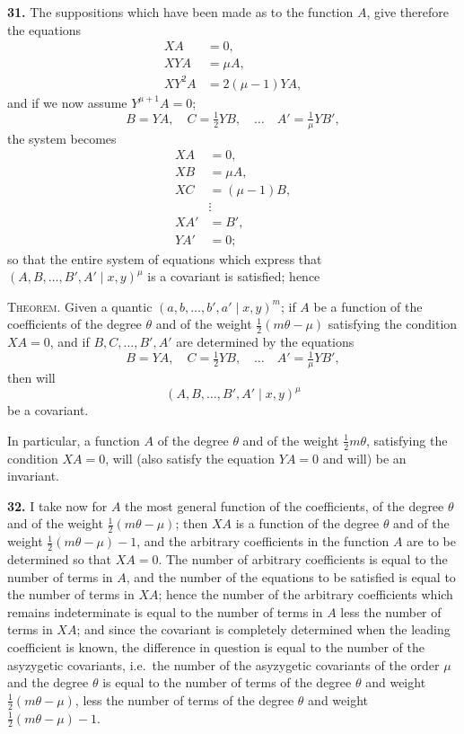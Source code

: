 \documentclass[11pt]{article}
\begin{document}
\textbf{31.} The suppositions which have been made as to the function $A$, give therefore the equations
\begin{align*}
XA &= 0, \\
XYA &= \mu A, \\
XY^2 A &= 2(\mu - 1)YA,
\end{align*}
and if we now assume $Y^{\mu+1}A = 0$;
\[
B = YA,\quad C = \tfrac{1}{2}YB,\quad \ldots\quad A' = \tfrac{1}{\mu}YB',
\]
the system becomes
\begin{align*}
XA &= 0, \\
XB &= \mu A, \\
XC &= (\mu - 1)B, \\
&\vdots \\
XA' &= B', \\
YA' &= 0;
\end{align*}
so that the entire system of equations which express that $(A, B, \ldots, B', A' \mid x, y)^\mu$ is a covariant is satisfied; hence

\medskip\noindent\textsc{Theorem.} Given a quantic $(a, b, \ldots, b', a' \mid x, y)^m$; if $A$ be a function of the coefficients of the degree $\theta$ and of the weight $\tfrac{1}{2}(m\theta - \mu)$ satisfying the condition $XA = 0$, and if $B, C, \ldots, B', A'$ are determined by the equations
\[
B = YA,\quad C = \tfrac{1}{2}YB,\quad \ldots\quad A' = \tfrac{1}{\mu}YB',
\]
then will
\[
(A, B, \ldots, B', A' \mid x, y)^\mu
\]
be a covariant.

In particular, a function $A$ of the degree $\theta$ and of the weight $\tfrac{1}{2}m\theta$, satisfying the condition $XA = 0$, will (also satisfy the equation $YA = 0$ and will) be an invariant.

\textbf{32.} I take now for $A$ the most general function of the coefficients, of the degree $\theta$ and of the weight $\tfrac{1}{2}(m\theta - \mu)$; then $XA$ is a function of the degree $\theta$ and of the weight $\tfrac{1}{2}(m\theta - \mu) - 1$, and the arbitrary coefficients in the function $A$ are to be determined so that $XA = 0$. The number of arbitrary coefficients is equal to the number of terms in $A$, and the number of the equations to be satisfied is equal to the number of terms in $XA$; hence the number of the arbitrary coefficients which remains indeterminate is equal to the number of terms in $A$ less the number of terms in $XA$; and since the covariant is completely determined when the leading coefficient is known, the difference in question is equal to the number of the asyzygetic covariants, i.e.\ the number of the asyzygetic covariants of the order $\mu$ and the degree $\theta$ is equal to the number of terms of the degree $\theta$ and weight $\tfrac{1}{2}(m\theta - \mu)$, less the number of terms of the degree $\theta$ and weight $\tfrac{1}{2}(m\theta - \mu) - 1$.
\end{document}

